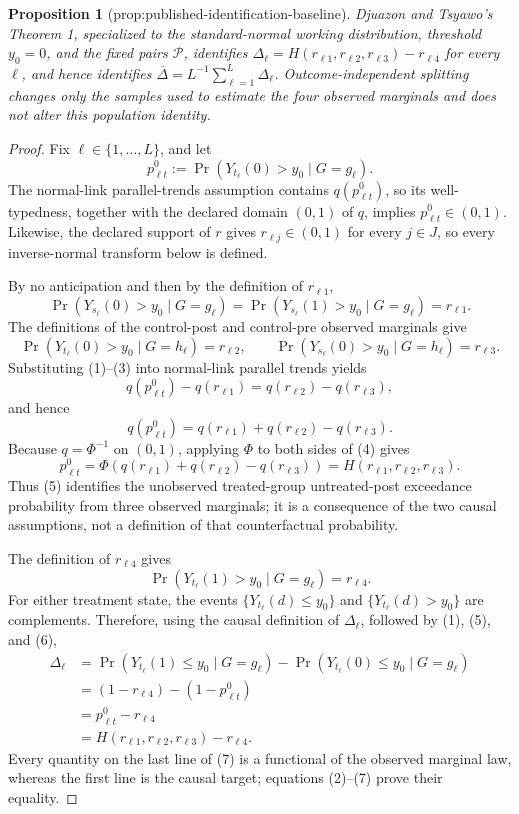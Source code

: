 \documentclass{article}
\newtheorem{proposition}{Proposition}
\begin{document}
\begin{proposition}[prop:published-identification-baseline]\label{prop:published-identification-baseline}
Djuazon and Tsyawo's Theorem 1, specialized to the standard-normal working distribution, threshold \(y_0=0\), and the fixed pairs \(\mathcal P\), identifies \(\Delta_{\ell}=H(r_{\ell1},r_{\ell2},r_{\ell3})-r_{\ell4}\) for every \(\ell\), and hence identifies \(\overline\Delta=L^{-1}\sum_{\ell=1}^{L}\Delta_{\ell}\). Outcome-independent splitting changes only the samples used to estimate the four observed marginals and does not alter this population identity.
\end{proposition}
\begin{proof}
Fix \(\ell\in\{1,\ldots,L\}\), and let
\[
p^0_{\ell t}:=\Pr\!\left(Y_{t_\ell}(0)>y_0\mid G=g_\ell\right).
\tag{1}
\]
The normal-link parallel-trends assumption contains \(q(p^0_{\ell t})\), so its well-typedness, together with the declared domain \((0,1)\) of \(q\), implies \(p^0_{\ell t}\in(0,1)\).  Likewise, the declared support of \(r\) gives \(r_{\ell j}\in(0,1)\) for every \(j\in J\), so every inverse-normal transform below is defined.

By no anticipation and then by the definition of \(r_{\ell1}\),
\[
\Pr\!\left(Y_{s_\ell}(0)>y_0\mid G=g_\ell\right)
=\Pr\!\left(Y_{s_\ell}(1)>y_0\mid G=g_\ell\right)
=r_{\ell1}.
\tag{2}
\]
The definitions of the control-post and control-pre observed marginals give
\[
\Pr\!\left(Y_{t_\ell}(0)>y_0\mid G=h_\ell\right)=r_{\ell2},
\qquad
\Pr\!\left(Y_{s_\ell}(0)>y_0\mid G=h_\ell\right)=r_{\ell3}.
\tag{3}
\]
Substituting (1)--(3) into normal-link parallel trends yields
\[
q(p^0_{\ell t})-q(r_{\ell1})
=q(r_{\ell2})-q(r_{\ell3}),
\]
and hence
\[
q(p^0_{\ell t})
=q(r_{\ell1})+q(r_{\ell2})-q(r_{\ell3}).
\tag{4}
\]
Because \(q=\Phi^{-1}\) on \((0,1)\), applying \(\Phi\) to both sides of (4) gives
\[
p^0_{\ell t}
=\Phi\!\left(q(r_{\ell1})+q(r_{\ell2})-q(r_{\ell3})\right)
=H(r_{\ell1},r_{\ell2},r_{\ell3}).
\tag{5}
\]
Thus (5) identifies the unobserved treated-group untreated-post exceedance probability from three observed marginals; it is a consequence of the two causal assumptions, not a definition of that counterfactual probability.

The definition of \(r_{\ell4}\) gives
\[
\Pr\!\left(Y_{t_\ell}(1)>y_0\mid G=g_\ell\right)=r_{\ell4}.
\tag{6}
\]
For either treatment state, the events \(\{Y_{t_\ell}(d)\le y_0\}\) and \(\{Y_{t_\ell}(d)>y_0\}\) are complements.  Therefore, using the causal definition of \(\Delta_\ell\), followed by (1), (5), and (6),
\[
\begin{aligned}
\Delta_\ell
&=\Pr\!\left(Y_{t_\ell}(1)\le y_0\mid G=g_\ell\right)
  -\Pr\!\left(Y_{t_\ell}(0)\le y_0\mid G=g_\ell\right)\\
&=(1-r_{\ell4})-(1-p^0_{\ell t})\\
&=p^0_{\ell t}-r_{\ell4}\\
&=H(r_{\ell1},r_{\ell2},r_{\ell3})-r_{\ell4}.
\end{aligned}
\tag{7}
\]
Every quantity on the last line of (7) is a functional of the observed marginal law, whereas the first line is the causal target; equations (2)--(7) prove their equality.


\end{proof}
\end{document}
